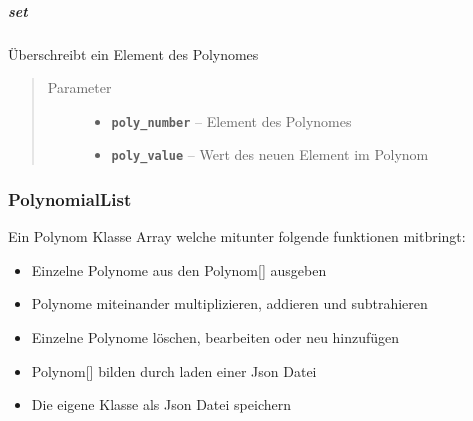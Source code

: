 \documentclass[letterpaper,10pt,ngerman]{sphinxmanual}
\begin{document}
\subparagraph{set}
\label{com/linuxluigi/polynomial/Polynomial:id4}

\begin{fulllineitems}
\label{com/linuxluigi/polynomial/Polynomial:com.linuxluigi.polynomial.Polynomial.set(int, double)}
Überschreibt ein Element des Polynomes
\begin{quote}\begin{description}
\item[{Parameter}] \leavevmode\begin{itemize}
\item {} 
\textbf{\texttt{poly\_number}} -- Element des Polynomes

\item {} 
\textbf{\texttt{poly\_value}} -- Wert des neuen Element im Polynom

\end{itemize}

\end{description}\end{quote}

\end{fulllineitems}



\subsubsection{PolynomialList}
\label{com/linuxluigi/polynomial/PolynomialList:polynomiallist}\label{com/linuxluigi/polynomial/PolynomialList::doc}

\begin{fulllineitems}
\label{com/linuxluigi/polynomial/PolynomialList:com.linuxluigi.polynomial.PolynomialList}
Ein Polynom Klasse Array welche mitunter folgende funktionen mitbringt:
\begin{itemize}
\item {} 
Einzelne Polynome aus den Polynom{[}{]} ausgeben

\item {} 
Polynome miteinander multiplizieren, addieren und subtrahieren

\item {} 
Einzelne Polynome löschen, bearbeiten oder neu hinzufügen

\item {} 
Polynom{[}{]} bilden durch laden einer Json Datei

\item {} 
Die eigene Klasse als Json Datei speichern

\end{itemize}

\end{fulllineitems}
\end{document}
